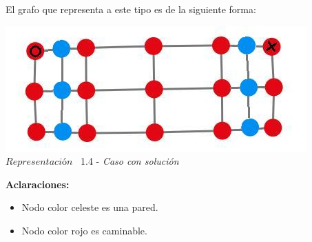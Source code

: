 El grafo que representa a este tipo es de la siguiente forma:\\

\vspace*{0.3cm} \vspace*{0.3cm}
  \begin{center}
 \includegraphics[scale=0.5]{./EJ1/ej1graforandom.jpeg}
 \\{$Representación$ \ 1.4 - \textit{Caso con solución}}
  \end{center}
  \vspace*{0.3cm}



\textbf{Aclaraciones:} 
\begin{itemize}
\item Nodo color celeste es una pared.
\item Nodo color rojo es caminable.
\end{itemize}
